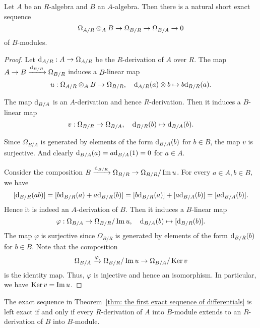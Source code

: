    \begin{theorem}\label{thm: the first exact sequence of differentials}
        Let \(A\) be an \(R\)-algebra and \(B\) an \(A\)-algebra. 
        Then there is a natural short exact sequence
        \[ \Omega_{A/R} \otimes_A B \to \Omega_{B/R} \to \Omega_{B/A} \to 0 \]
        of \(B\)-modules.
    \end{theorem}
    \begin{proof}
        Let \({\mathrm{d}}_{A/R}: A \to \Omega_{A/R}\) be the \(R\)-derivation of \(A\) over \(R\).
        The map \(A \to B \xrightarrow{{\mathrm{d}}_{B/R}} \Omega_{B/R}\) induces a \(B\)-linear map 
        \[ u: \Omega_{A/R} \otimes_A B \to \Omega_{B/R}, \quad {\mathrm{d}}_{A/R}(a) \otimes b \mapsto b{\mathrm{d}}_{B/R}(a). \]
        
        The map \({\mathrm{d}}_{B/A}\) is an \(A\)-derivation and hence \(R\)-derivation.
        Then it induces a \(B\)-linear map 
        \[ v: \Omega_{B/R} \to \Omega_{B/A}, \quad {\mathrm{d}}_{B/R}(b) \mapsto {\mathrm{d}}_{B/A}(b). \]

        Since \(\Omega_{B/A}\) is generated by elements of the form \({\mathrm{d}}_{B/A}(b)\) for \(b \in B\),
        the map \(v\) is surjective.
        And clearly \({\mathrm{d}}_{B/A}(a) = a{\mathrm{d}}_{B/A}(1) = 0\) for \(a \in A\). 

        Consider the composition \( B \xrightarrow{{\mathrm{d}}_{B/R}} \Omega_{B/R} \to \Omega_{B/R}/\operatorname{Im} u\).
        For every \(a \in A, b\in B\), we have 
        \[ [{\mathrm{d}}_{B/R}(ab)] = [b{\mathrm{d}}_{B/R}(a) + a{\mathrm{d}}_{B/R}(b)] = [b{\mathrm{d}}_{B/R}(a)] + [a{\mathrm{d}}_{B/A}(b)] = [a{\mathrm{d}}_{B/A}(b)]. \]
        Hence it is indeed an \(A\)-derivation of \(B\).
        Then it induces a \(B\)-linear map 
        \[ \varphi: \Omega_{B/A} \to \Omega_{B/R}/\operatorname{Im} u, \quad {\mathrm{d}}_{B/A}(b) \mapsto [{\mathrm{d}}_{B/R}(b)]. \]
        The map \(\varphi\) is surjective since \(\Omega_{B/R}\) is generated by elements of the form \({\mathrm{d}}_{B/R}(b)\) for \(b \in B\).
        Note that the composition 
        \[ \Omega_{B/A} \xrightarrow{\varphi} \Omega_{B/R}/\operatorname{Im} u \to \Omega_{B/A}/\operatorname{Ker} v \]
        is the identity map.
        Thus, \(\varphi\) is injective and hence an isomorphism.
        In particular, we have \(\operatorname{Ker} v = \operatorname{Im} u\).
    \end{proof}

    \begin{remark}\label{rmk: the first exact sequence of differentials is left exact}
        The exact sequence in Theorem~\ref{thm: the first exact sequence of differentials} is left exact 
        if and only if every \(R\)-derivation of \(A\) into \(B\)-module extends to an \(R\)-derivation of \(B\) into \(B\)-module.
        
    \end{remark}


